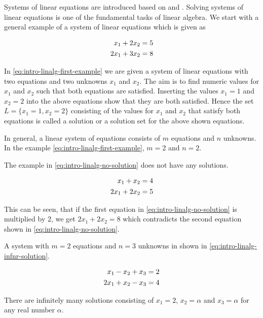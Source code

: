 \documentclass[
]{book}
\theoremstyle{definition}
\theoremstyle{definition}
\theoremstyle{definition}
\theoremstyle{remark}
\begin{document}
Systems of linear equations are introduced based on \citep{Nipp2002} and \citep{Searle1971}. Solving systems of linear equations is one of the fundamental tasks of linear algebra. We start with a general example of a system of linear equations which is given as

\begin{align}
 x_1 + 2x_2 &= 5 \notag \\
2x_1 + 3x_2 &= 8
\label{eq:intro-linalg-first-example}
\end{align}

In \eqref{eq:intro-linalg-first-example} we are given a system of linear equations with two equations and two unknowns \(x_1\) and \(x_2\). The aim is to find numeric values for \(x_1\) and \(x_2\) such that both equations are satisfied. Inserting the values \(x_1 = 1\) and \(x_2 = 2\) into the above equations show that they are both satisfied. Hence the set \(L = \{x_1 = 1, x_2 = 2\}\) consisting of the values for \(x_1\) and \(x_2\) that satisfy both equations is called a solution or a solution set for the above shown equations.

In general, a linear system of equations consists of \(m\) equations and \(n\) unknowns. In the example \eqref{eq:intro-linalg-first-example}, \(m=2\) and \(n=2\).

The example in \eqref{eq:intro-linalg-no-solution} does not have any solutions.

\begin{align}
 x_1 +  x_2 &= 4 \notag \\
2x_1 + 2x_2 &= 5
\label{eq:intro-linalg-no-solution}
\end{align}

This can be seen, that if the first equation in \eqref{eq:intro-linalg-no-solution} is multiplied by \(2\), we get \(2x_1 + 2x_2 = 8\) which contradicts the second equation shown in \eqref{eq:intro-linalg-no-solution}.

A system with \(m=2\) equations and \(n=3\) unknowns in shown in \eqref{eq:intro-linalg-infnr-solution}.

\begin{align}
 x_1 -  x_2 +  x_3 &= 2 \notag \\
2x_1 +  x_2 -  x_3 &= 4  
\label{eq:intro-linalg-infnr-solution}
\end{align}

There are infinitely many solutions consisting of \(x_1 = 2\), \(x_2 = \alpha\) and \(x_3 = \alpha\) for any real number \(\alpha\).
\end{document}
